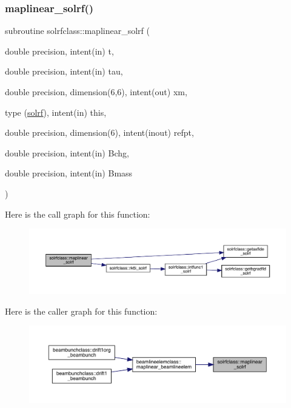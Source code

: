 \subsubsection{\texorpdfstring{maplinear\_solrf()}{maplinear\_solrf()}}
{\footnotesize\ttfamily subroutine solrfclass\+::maplinear\+\_\+solrf (\begin{DoxyParamCaption}\item[{double precision, intent(in)}]{t,  }\item[{double precision, intent(in)}]{tau,  }\item[{double precision, dimension(6,6), intent(out)}]{xm,  }\item[{type (\mbox{\hyperlink{namespacesolrfclass_structsolrfclass_1_1solrf}{solrf}}), intent(in)}]{this,  }\item[{double precision, dimension(6), intent(inout)}]{refpt,  }\item[{double precision, intent(in)}]{Bchg,  }\item[{double precision, intent(in)}]{Bmass }\end{DoxyParamCaption})}

Here is the call graph for this function\+:\nopagebreak
\begin{figure}[H]
\begin{center}
\leavevmode
\includegraphics[width=350pt]{namespacesolrfclass_a70f5e9afe73a56ed66363e6ca3207226_cgraph}
\end{center}
\end{figure}
Here is the caller graph for this function\+:\nopagebreak
\begin{figure}[H]
\begin{center}
\leavevmode
\includegraphics[width=350pt]{namespacesolrfclass_a70f5e9afe73a56ed66363e6ca3207226_icgraph}
\end{center}
\end{figure}
\mbox{\label{namespacesolrfclass_a47bcede8ab38e0e035ef1be479490018}} 
